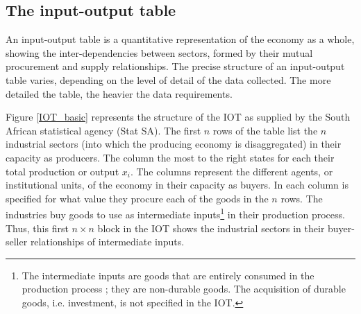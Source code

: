 \documentclass[12pt,english]{article}
\begin{document}



\subsection{The input-output table}\label{section_IOtable}

An input-output table is a quantitative representation of the economy as a whole, showing the inter-dependencies between sectors, formed by their mutual procurement and supply relationships. %
The precise structure of an input-output table varies, %
depending on the level of detail of the data collected. The more detailed the table, the heavier the data requirements. %

Figure \ref{IOT_basic} represents the structure of the IOT as supplied by the South African statistical agency (Stat SA). The first $n$ rows of the table list the $n$ industrial sectors (into which the producing economy is disaggregated) in their capacity as producers. The column the most to the right states for each their total production or output $x_i$. 
The columns represent the different agents, or institutional units, of the economy in their capacity as buyers. In each column is specified for what value they procure each of the goods in the $n$ rows. %
The industries buy goods to use as intermediate inputs\footnote{The intermediate inputs are goods that are entirely consumed in the production process ; they are non-durable goods. The acquisition of durable goods, i.e. investment, is not specified in the IOT.} in their production process. Thus, this first $n \times n$ block in the IOT shows the industrial sectors in their buyer-seller relationships of intermediate inputs. 
\end{document}
